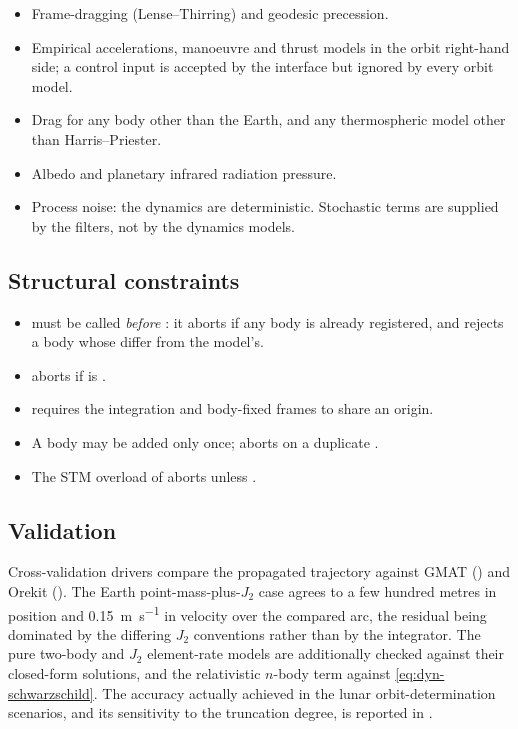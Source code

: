 \begin{itemize}[leftmargin=1.4em]
  \item Frame-dragging (Lense--Thirring) and geodesic precession.
  \item Empirical accelerations, manoeuvre and thrust models in the orbit
    right-hand side; a control input  is accepted by the interface but
    ignored by every orbit model.
  \item Drag for any body other than the Earth, and any thermospheric model other
    than Harris--Priester.
  \item Albedo and planetary infrared radiation pressure.
  \item Process noise: the dynamics are deterministic. Stochastic terms are
    supplied by the filters, not by the dynamics models.
\end{itemize}

\subsection{Structural constraints}

\begin{itemize}[leftmargin=1.4em]
  \item {} must be called \emph{before} : it aborts if
    any body is already registered, and  rejects a body whose
     differ from the model's.
  \item {} aborts if  is .
  \item {} requires the integration and body-fixed
    frames to share an origin.
  \item A body may be added only once;  aborts on a duplicate
    .
  \item The STM overload of  aborts unless
    .
\end{itemize}

\subsection{Validation}

Cross-validation drivers compare the propagated trajectory against GMAT
\citep{gmat2023} () and
Orekit (). The Earth
point-mass-plus-$J_2$ case agrees to a few hundred metres in position and
\SI{0.15}{\meter\per\second} in velocity over the compared arc, the residual
being dominated by the differing $J_2$ conventions rather than by the integrator.
The pure two-body and $J_2$ element-rate models are additionally checked against
their closed-form solutions, and the relativistic $n$-body term against
\cref{eq:dyn-schwarzschild}. The accuracy actually achieved in the lunar
orbit-determination scenarios, and its sensitivity to the truncation degree, is
reported in \citep[Ch.~2]{iiyama2026thesis}.
